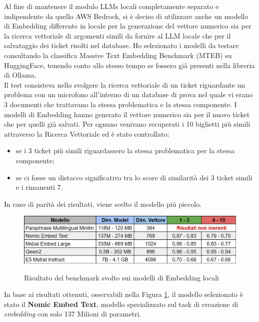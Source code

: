 Al fine di mantenere il modulo LLMs locali completamente separato e indipendente da quello AWS Bedrock, si è 
deciso di utilizzare anche un modello di Embedding differente in locale per la generazione del vettore numerico sia per la 
ricerca vettoriale di argomenti simili da fornire al LLM locale che per il salvataggio dei ticket risolti nel database. 
Ho selezionato i modelli da testare consultando la classifica Massive Text Embedding Benchmark (MTEB) su HuggingFace, tenendo conto allo stesso tempo se fossero già presenti nella libreria di Ollama.\\
Il test consisteva nello svolgere la ricerca vettoriale di un ticket riguardante un problema con un microfono all’interno di un database di prova nel quale vi erano 3 documenti che trattavano la stessa problematica e la stessa componente.
I modelli di Embedding hanno generato il vettore numerico sia per il nuovo ticket che per quelli già salvati. 
Per ognuno venivano recuperati i 10 biglietti più simili attraverso la Ricerca Vettoriale ed è stato controllato:
\begin{itemize}
    \item se i 3 ticket più simili riguardassero la stessa problematica per la stessa componente;
    \item se ci fosse un distacco significativo tra lo score di similarità dei 3 ticket simili e i rimanenti 7.
\end{itemize}
In caso di parità dei risultati, viene scelto il modello più piccolo. 

\begin{figure}[H]
    \centering
    \includegraphics[alt={Tabella con risultati del benchmark sui modelli di Embedding locali}, width=1\columnwidth]{img/EmbeddingModelsLocal.png}
    \caption{Risultato del benchmark svolto sui modelli di Embedding locali}
    \label{fig:results_local_emb_models}
\end{figure}

In base ai risultati ottenuti, osservabili nella Figura \ref{fig:results_local_emb_models}, il modello selezionato è stato
il \textbf{Nomic Embed Text}, modello specializzato sul task di creazione di \textit{embedding} con solo 137 Milioni di parametri.


